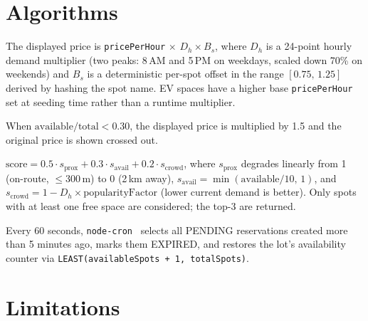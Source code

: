 \documentclass[11pt,letterpaper]{article}
\begin{document}
\section{Algorithms}

\begin{description}[leftmargin=1.4em]
  \item[Dynamic pricing]
        The displayed price is \texttt{pricePerHour} $\times$ $D_h \times B_s$,
        where $D_h$ is a 24-point hourly demand multiplier (two peaks: 8\,AM and
        5\,PM on weekdays, scaled down 70\% on weekends) and $B_s$ is a
        deterministic per-spot offset in the range $[0.75,\,1.25]$ derived by
        hashing the spot name. EV spaces have a higher base \texttt{pricePerHour}
        set at seeding time rather than a runtime multiplier.

  \item[Surge pricing]
        When $\text{available}/\text{total} < 0.30$, the displayed price is
        multiplied by 1.5 and the original price is shown crossed out.

  \item[Recommendation scoring]
        $\text{score} = 0.5 \cdot s_{\text{prox}} + 0.3 \cdot s_{\text{avail}}
        + 0.2 \cdot s_{\text{crowd}}$,
        where $s_{\text{prox}}$ degrades linearly from 1 (on-route, $\leq$300\,m)
        to 0 (2\,km away), $s_{\text{avail}} = \min(\text{available}/10,\,1)$, and
        $s_{\text{crowd}} = 1 - D_h \times \text{popularityFactor}$ (lower current
        demand is better). Only spots with at least one free space are considered;
        the top-3 are returned.

  \item[Expiry cron]
        Every 60 seconds, \texttt{node-cron}~\cite{nodecron} selects all PENDING
        reservations created more than 5 minutes ago, marks them EXPIRED, and
        restores the lot's availability counter via
        \texttt{LEAST(availableSpots + 1, totalSpots)}.
\end{description}

\section{Limitations}
\end{document}
